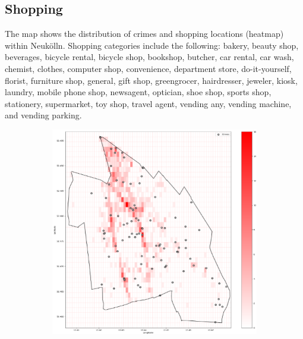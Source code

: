 \subsection{Shopping}
The map shows the distribution of crimes and shopping locations (heatmap) within Neukölln. Shopping categories include the following: bakery, beauty shop, beverages, bicycle rental, bicycle shop, bookshop, butcher, car rental, car wash, chemist, clothes, computer shop, convenience, department store, do-it-yourself, florist, furniture shop, general, gift shop, greengrocer, hairdresser, jeweler, kiosk, laundry, mobile phone shop, newsagent, optician, shoe shop, sports shop, stationery, supermarket, toy shop, travel agent, vending any, vending machine, and vending parking. 
\begin{figure}[h]
    \centering
    \begin{subfigure}[b]{0.45\textwidth}
        \centering
        \includegraphics[width=\textwidth]{./figures/Gerard/shopping.png}
        \caption{}
        \label{fig:image1}
    \end{subfigure}
    \hfill
    \begin{subfigure}[b]{0.45\textwidth}
        \centering

\end{subfigure}
\end{figure}
